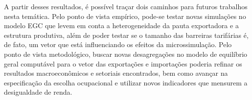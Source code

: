 A partir desses resultados, é possível traçar dois caminhos para futuros trabalhos nesta temática. Pelo ponto de vista empírico, pode-se testar novas simulações no modelo EGC que levem em conta a heterogeneidade da pauta exportadora e a estrutura produtiva, além de poder testar se o tamanho das barreiras tarifárias é, de fato, um vetor que está influenciando os efeitos da microssimulação. Pelo ponto de vista metodológico, buscar novas desagregações no modelo de equilíbrio geral computável para o vetor das exportações e importações poderia refinar os resultados macroeconômicos e setoriais encontrados, bem como avançar na especificação da escolha ocupacional e utilizar novos indicadores que mensurem a desigualdade de renda.


